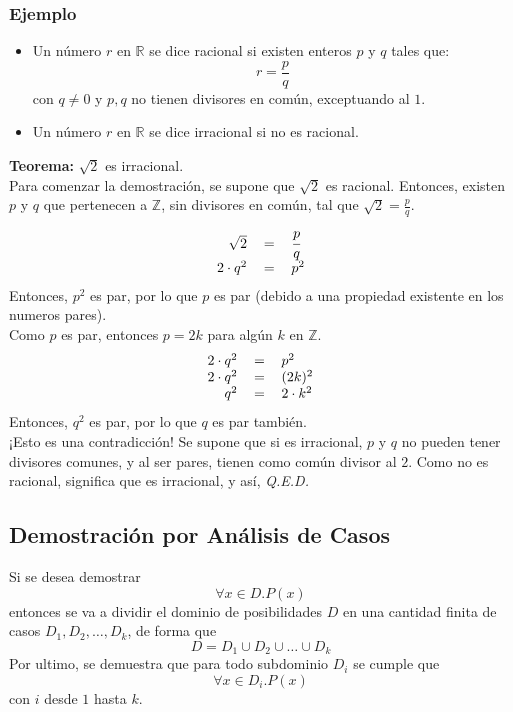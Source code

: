 \documentclass[../main.tex]{subfiles}
\begin{document}
\subsubsection*{Ejemplo}
\begin{itemize}
    \item Un número $r$ en $\mathds{R}$ se dice racional si existen enteros $p$ y $q$ tales que: \[ r = \frac{p}{q} \]con $q \not= 0$ y $p, q$ no tienen divisores en común, exceptuando al $1$.
    \item Un número $r$ en $\mathds{R}$ se dice irracional si no es racional.
\end{itemize}
\textbf{Teorema:} $\sqrt{2}$ es irracional.\\
Para comenzar la demostración, se supone que $\sqrt{2}$ es racional. Entonces, existen $p$ y $q$ que pertenecen a $\mathds{Z}$, sin divisores en común, tal que $\sqrt{2} = \frac{p}{q}$.
\[
    \begin{tabular}{rcl}
        $\sqrt{2}$ & $=$ & $\cfrac{p}{q}$\\
        $2 \cdot q^2$ & $=$ & $p^2$\\
        
    \end{tabular}
\]
Entonces, $p^2$ es par, por lo que $p$ es par (debido a una propiedad existente en los numeros pares).\\
Como $p$ es par, entonces $p = 2k$ para algún $k$ en $\mathds{Z}$.
\[
    \begin{tabular}{rcl}
        $2 \cdot q^2$ & $=$ & $p^2$\\
        $2 \cdot q^2$ & $=$ & $(2k)^2$\\
        $q^2$ & $=$ & $2 \cdot k^2$\\
    \end{tabular}
\]
Entonces, $q^2$ es par, por lo que $q$ es par también.\\
¡Esto es una contradicción! Se supone que si es irracional, $p$ y $q$ no pueden tener divisores comunes, y al ser pares, tienen como común divisor al $2$. Como no es racional, significa que es irracional, y así, \textit{Q.E.D.}

\subsection{Demostración por Análisis de Casos}
Si se desea demostrar
\[ \forall x \in D . P(x) \]
entonces se va a dividir el dominio de posibilidades $D$ en una cantidad finita de casos $D_{1}, D_{2}, \ldots, D_{k}$, de forma que
\[ D = D_{1} \cup D_{2} \cup \ldots \cup D_{k} \]
Por ultimo, se demuestra que para todo subdominio $D_{i}$ se cumple que
\[ \forall x \in D_{i} . P(x) \]
con $i$ desde $1$ hasta $k$.
\end{document}
